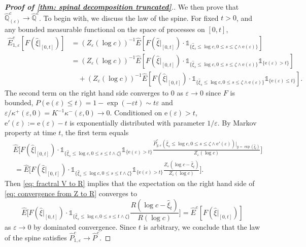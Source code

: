 \documentclass[12pt]{article}
\numberwithin{equation}{section}
\theoremstyle{plain}
\theoremstyle{definition}
\begin{document}
\begin{proof}[\textbf{Proof of \cref{thm: spinal decomposition truncated}}.]
We then prove that $\hat{\mathbb{Q}}^{c}_{(\varepsilon)} \to \hat{\mathbb{Q}}^c$. To begin with, we discuss the law of the spine. For fixed $t>0$, and any bounded measurable functional on the space of processes on $[0, t]$,
\begin{align*}
\hat{E}^c_{1, \varepsilon}[F(\hat{\xi}|_{[0, t]})] &= (Z_{\varepsilon}(\log c ))^{-1}\hat{E}[F(\hat{\xi}|_{[0, t]})\cdot \mathds{1}_{\{\hat\xi_s \leq \log c, 0\leq s\leq \zeta\wedge \mathrm{e}(\varepsilon)\}}]\\
&= (Z_{\varepsilon}(\log c))^{-1}\hat{E}[F(\hat{\xi}|_{[0, t]})\cdot \mathds{1}_{\{\hat\xi_s \leq \log c, 0\leq s\leq \zeta\wedge \mathrm{e}(\varepsilon)\}}\mathds{1}_{\{\mathrm{e}(\varepsilon)>t \}}]\\
&\quad+ (Z_{\varepsilon}(\log c))^{-1}\hat{E}[F(\hat{\xi}|_{[0, t]})\cdot \mathds{1}_{\{\hat\xi_s \leq \log c, 0\leq s\leq \zeta\wedge \mathrm{e}(\varepsilon)\}}\mathds{1}_{\{\mathrm{e}(\varepsilon)\leq t \}}].
\end{align*}
The second term on the right hand side converges to $0$ as $\varepsilon\to 0$ since $F$ is bounded, $P(\mathrm{e}(\varepsilon)\leq t) = 1-\exp(-\varepsilon t) \sim t \varepsilon$ and $\varepsilon/\kappa^+(\varepsilon, 0) = K^{-1}\kappa^-(\varepsilon, 0)\to 0$. Conditioned on $\mathrm{e}(\varepsilon)>t$, $\mathrm{e}'(\varepsilon) := \mathrm{e}(\varepsilon)-t$ is exponentially distributed with parameter $1/\varepsilon$. By Markov property at time $t$, the first term equals
\begin{equation}\label{eq: convergence from Z to R}
\begin{split}
    &\hat{E}\bigg[F(\hat{\xi}|_{[0, t]})\cdot \mathds{1}_{\{\hat\xi_s \leq \log c, 0\leq s\leq t\wedge \zeta\}}\mathds{1}_{\{\mathrm{e}(\varepsilon) > t\}}\frac{\hat{P}^c_{y, \varepsilon}(\hat{\xi}_s\leq \log c, 0\leq s \leq \zeta\wedge\mathrm{e}'(\varepsilon))|_{y = \exp(\hat{\xi}_t)}}{Z_{\varepsilon}(\log c )}\bigg]\\
&\,= \hat{E}\bigg[F(\hat{\xi}|_{[0, t]})\cdot \mathds{1}_{\{\hat\xi_s \leq \log c, 0\leq s\leq t\wedge \zeta\}}\mathds{1}_{\{\mathrm{e}(\varepsilon) > t\}}\frac{Z_{\varepsilon}(\log c - \hat{\xi}_t)}{Z_{\varepsilon}(\log c )}\bigg].
\end{split}
\end{equation}
Then \eqref{eq: fractral V to R} implies that the expectation on the right hand side of \eqref{eq: convergence from Z to R} converges to
\[\hat{E}\bigg[F(\hat{\xi}|_{[0, t]})\cdot \mathds{1}_{\{\hat\xi_s \leq \log c, 0\leq s\leq t\wedge \zeta\}}\frac{R(\log c - \hat{\xi}_t)}{R(\log c )}\bigg]=\hat{E}^{c}[F(\hat{\xi}|_{[0, t]}) ]\]
as $\varepsilon\to 0$ by dominated convergence. Since $t$ is arbitrary, we conclude that the law of the spine satisfies $\hat{P}^c_{1,\varepsilon} \to \hat{P}^c$.


\end{proof}
\end{document}
